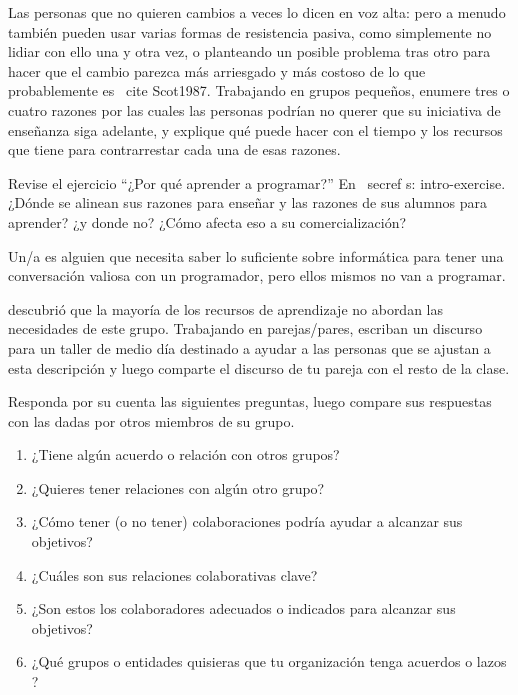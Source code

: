 
Las personas que no quieren cambios a veces lo dicen en voz alta:
pero a menudo también pueden usar varias formas de resistencia pasiva,
como simplemente no lidiar con ello una y otra vez,
o planteando un posible problema tras otro 
para hacer que el cambio parezca más arriesgado y más costoso de lo que probablemente es
\ cite {Scot1987}.
Trabajando en grupos pequeños,
enumere tres o cuatro razones por las cuales las personas podrían no querer que su iniciativa de enseñanza siga adelante,
y explique qué puede hacer con el tiempo y los recursos que tiene para contrarrestar cada una de esas razones.



Revise el ejercicio ``¿Por qué aprender a programar?'' En \ secref {s: intro-exercise}.
¿Dónde se alinean sus razones para enseñar y las razones de sus alumnos para aprender?
¿y donde no?
¿Cómo afecta eso a su comercialización?


Un/a 
es alguien que necesita saber lo suficiente sobre informática
para tener una conversación valiosa con un programador,
pero ellos mismos no van a programar.

\cite{Wang2018} descubrió que la mayoría de los recursos de aprendizaje no abordan las necesidades de este grupo.
Trabajando en parejas/pares,
escriban un discurso para un taller de medio día destinado a ayudar a las personas que se ajustan a esta descripción
y luego comparte el discurso de tu pareja con el resto de la clase.


Responda por su cuenta las siguientes preguntas,
luego compare sus respuestas con las dadas por otros miembros de su grupo.


\begin{enumerate}

\item
¿Tiene algún acuerdo o relación con otros grupos?

\item
¿Quieres tener relaciones con algún otro grupo?
\item
¿Cómo tener (o no tener) colaboraciones
podría ayudar a alcanzar sus objetivos?
\item
¿Cuáles son sus relaciones colaborativas clave?
\item
¿Son estos los colaboradores adecuados o indicados para alcanzar sus objetivos?
\item
¿Qué grupos o entidades quisieras que tu organización
tenga acuerdos o lazos ?


\end{enumerate}

